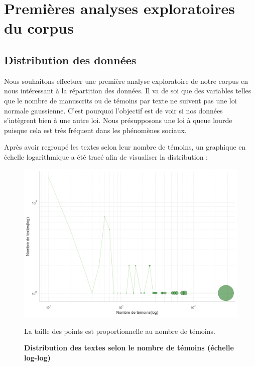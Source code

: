\documentclass[a4paper,twoside,12pt]{book}
\begin{document}
\section{Premières analyses exploratoires du corpus}

\subsection{Distribution des données}
Nous souhaitons effectuer une première analyse exploratoire de notre corpus en nous intéressant à la répartition des données. Il va de soi que des variables telles que le nombre de manuscrits ou de témoins par texte ne suivent pas une loi normale gaussienne. C'est pourquoi l'objectif est de voir si nos données s'intègrent bien à une autre loi. Nous présupposons une loi à queue lourde puisque cela est très fréquent dans les phénomènes sociaux.

Après avoir regroupé les textes selon leur nombre de témoins, un graphique en échelle logarithmique a été tracé afin de visualiser la distribution :

\begin{figure}[H]
	\centering
	\includegraphics[width=\textwidth]{img/logtextetemoin.png} 
	\caption{\textbf{Distribution des textes selon le nombre de témoins (échelle log-log)}} 
     La taille des points est proportionnelle au nombre de témoins.
	\label{fig:monimage}
\end{figure}
\end{document}
